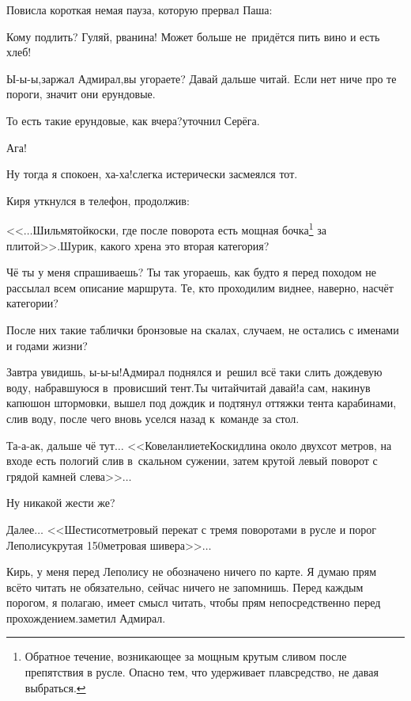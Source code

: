 Повисла короткая немая пауза, которую прервал Паша:

\diagdash Кому подлить? Гуляй, рванина! Может больше не~придётся пить вино и есть хлеб!

\diagdash Ы-ы-ы,\mdash заржал Адмирал,\mdash вы угораете? Давай дальше читай. Если нет ниче про те пороги, значит они ерундовые.

\diagdash То есть такие ерундовые, как вчера?\mdash уточнил Серёга.

\diagdash Ага!

\diagdash Ну тогда я спокоен, ха-ха!\mdash слегка истерически засмеялся тот.

Киря уткнулся в телефон, продолжив:

\diagdash <<$\ldots$Шильмятойкоски, где после поворота есть мощная бочка\footnote{Обратное течение, возникающее за мощным крутым сливом после препятствия в русле. Опасно тем, что удерживает плавсредство, не давая выбраться.} за плитой>>.\mdash Шурик, какого хрена это вторая категория?

\diagdash Чё ты у меня спрашиваешь? Ты так угораешь, как будто я перед походом не рассылал всем описание маршрута. Те, кто проходил\mdash им виднее, наверно, насчёт категории? 

\diagdash После них такие таблички бронзовые на скалах, случаем, не остались с именами и годами жизни?

\diagdash Завтра увидишь, ы-ы-ы!\mdash Адмирал поднялся и~решил всё таки слить дождевую воду, набравшуюся в~провисший тент.\mdash Ты читай\sdash читай давай!\mdash а сам, накинув капюшон штормовки, вышел под дождик и подтянул оттяжки тента карабинами, слив воду, после чего вновь уселся назад к~команде за стол.

\diagdash Та-а-ак, дальше чё тут$\ldots$ <<Ковеланлиете\sdash Коски\mdash длина около двухсот метров, на входе есть пологий слив в~скальном сужении, затем крутой левый поворот с грядой камней слева>>$\ldots$

\diagdash Ну никакой жести же?

\diagdash Далее$\ldots$ <<Шестисотметровый перекат с тремя поворотами в русле и порог Леполису\mdash крутая 150\sdash метровая шивера>>$\ldots$

\diagdash Кирь, у меня перед Леполису не обозначено ничего по карте. Я думаю прям всё\sdash то читать не обязательно, сейчас ничего не запомнишь. Перед каждым порогом, я полагаю, имеет смысл читать, чтобы прям непосредственно перед прохождением.\mdash заметил Адмирал.

